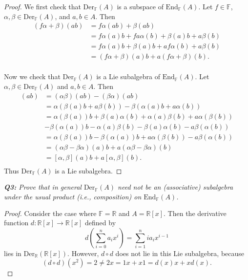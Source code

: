 \documentclass{article}
\begin{document}
  \begin{proof}
    We first check that $\text{Der}_{\mathbb{F}}(A)$ is a subspace of
    $\text{End}_{\mathbb{F}}(A)$. Let $f\in\mathbb{F}$,
    $\alpha,\beta\in\text{Der}_{\mathbb{F}}(A)$, and $a,b\in A$. Then
    \begin{align*}
      (f\alpha+\beta)(ab) &=f\alpha(ab) +\beta(ab)\\
      &=f\alpha(a)b +fa\alpha(b) +\beta(a)b +a\beta(b)\\
      &=f\alpha(a)b +\beta(a)b +af\alpha(b) +a\beta(b)\\
      &=(f\alpha+\beta)(a)b +a(f\alpha+\beta)(b).\\
    \end{align*}

    Now we check that $\text{Der}_{\mathbb{F}}(A)$ is a Lie subalgebra of
    $\text{End}_{\mathbb{F}}(A)$. Let
    $\alpha,\beta\in\text{Der}_{\mathbb{F}}(A)$ and $a,b\in A$. Then
    \begin{align*}
      [\alpha,\beta](ab) &=(\alpha\beta)(ab) -(\beta\alpha)(ab)\\
      &=\alpha(\beta(a)b+a\beta(b)) -\beta(\alpha(a)b+a\alpha(b))\\
      &=\alpha(\beta(a))b +\beta(a)\alpha(b) +\alpha(a)\beta(b)
        +a\alpha(\beta(b))\\
      &-\beta(\alpha(a))b -\alpha(a)\beta(b) -\beta(a)\alpha(b)
        -a\beta(\alpha(b))\\
      &=\alpha(\beta(a))b -\beta(\alpha(a))b + a\alpha(\beta(b))
        -a\beta(\alpha(b))\\
      &=(\alpha\beta-\beta\alpha)(a)b + a(\alpha\beta-\beta\alpha)(b)\\
      &=[\alpha,\beta](a)b + a[\alpha,\beta](b).\\
    \end{align*}
    Thus $\text{Der}_{\mathbb{F}}(A)$ is a Lie subalgebra.
  \end{proof}

\it \textbf{Q3:} Prove that in general $\text{Der}_{\mathbb{F}}(A)$ need
  not be an (associative) subalgebra under the usual product (i.e.,
  composition) on $\text{End}_{\mathbb{F}}(A)$.

  \begin{proof}
    Consider the case where $\mathbb{F}=\mathbb{R}$ and $A=\mathbb{R}[x]$.
    Then the derivative function $d:\mathbb{R}[x]\rightarrow\mathbb{R}[x]$
    defined by
    \[d\left(\sum_{i=0}^{n}a_ix^i\right) =\sum_{i=1}^{n}ia_ix^{i-1}\]
    lies in $\text{Der}_{\mathbb{R}}(\mathbb{R}[x])$. However, $d\circ d$
    does not lie in this Lie subalgebra, because
    \[(d\circ d)(x^2)=2\neq2x =1x+x1 =d(x)x+xd(x).\]
  \end{proof}
\end{document}
